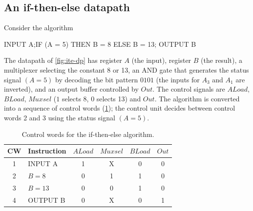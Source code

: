 \subsection{An if-then-else datapath}
Consider the algorithm
\begin{center}\ttfamily\small
INPUT A;\quad IF (A = 5) THEN B = 8 ELSE B = 13; \quad OUTPUT B
\end{center}
The datapath of \cref{fig:ite-dp} has register $A$ (the input), register $B$ (the result), a multiplexer selecting the constant 8 or 13, an AND gate that generates the status signal $(A=5)$ by decoding the bit pattern $0101$ (the inputs for $A_3$ and $A_1$ are inverted), and an output buffer controlled by $Out$. The control signals are $ALoad$, $BLoad$, $Muxsel$ ($1$ selects 8, $0$ selects 13) and $Out$. The algorithm is converted into a sequence of control words (\cref{tab:cw-ite}); the control unit decides between control words 2 and 3 using the status signal $(A=5)$.


\begin{table}[htbp]
\centering
\caption{Control words for the if-then-else algorithm.}
\label{tab:cw-ite}
\begin{tabular}{cl|cccc}
\toprule CW & Instruction & $ALoad$ & $Muxsel$ & $BLoad$ & $Out$\\ \midrule
1 & INPUT A & 1 & X & 0 & 0\\ 2 & $B=8$ & 0 & 1 & 1 & 0\\ 3 & $B=13$ & 0 & 0 & 1 & 0\\ 4 & OUTPUT B & 0 & X & 0 & 1\\ \bottomrule
\end{tabular}
\end{table}

